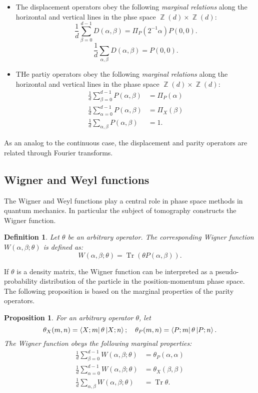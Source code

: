 \documentclass[a4paper]{article}
\DeclareMathOperator{\Z}{\mathbb{Z}}
\DeclareMathOperator{\Tr}{Tr}
\newtheorem{definition}{Definition}
\newtheorem{proposition}{Proposition}
\begin{document}
  \begin{itemize}
    \item The displacement operators obey the following
      \textit{marginal relations} along the horizontal and
      vertical lines in the phse space $\Z(d) \times \Z(d)$:
      \[
        \frac{1}{d} \sum_{\beta=0}^{d-1} D(\alpha,\beta)
        = \Pi_P(2^{-1}\alpha)P(0,0).
      \] 
      \[
        \frac{1}{d} \sum_{\alpha,\beta}^{} D(\alpha,\beta) =
        P(0,0).
      \] 
    \item THe partiy operators obey the following
      \textit{marginal relations} along the horizontal and
      vertical lines in the phase space $\Z(d) \times
      \Z(d)$:
      \begin{align*}
        \frac{1}{d} \sum_{\beta=0}^{d-1} P(\alpha,\beta)
        &= \Pi_P(\alpha) \\
        \frac{1}{d} \sum_{\alpha=0}^{d-1} P(\alpha,\beta)
        &= \Pi_X(\beta) \\
        \frac{1}{d} \sum_{\alpha,\beta}^{} P(\alpha,\beta)
        &= 1.
      \end{align*}
  \end{itemize}

  As an analog to the continuous case, the displacement and
  parity operators are related through Fourier transforms.

  \subsection{Wigner and Weyl functions}

  The Wigner and Weyl functions play a central role in phase
  space methods in quantum mechanics. In particular the
  subject of tomography constructs the Wigner function.

  \begin{definition}
    Let $\theta$ be an arbitrary operator. The corresponding
    Wigner function $W(\alpha,\beta; \theta)$ is defined as:
    \[
      W(\alpha,\beta; \theta) = \Tr\left( \theta
      P(\alpha,\beta) \right).
    \] 
  \end{definition}
  If $\theta$ is a density matrix, the Wigner function can
  be interpreted as a pseudo-probability distribution of the
  particle in the position-momentum phase space. The
  following proposition is based on the marginal properties
  of the parity operators.

  \begin{proposition}
    For an arbitrary operator $\theta$, let
    \[
      \theta_X(m,n) = \bra{X; m}\theta\ket{X; n};
      \quad
      \theta_P(m,n) = \bra{P; m}\theta\ket{P; n}.
    \] 
    The Wigner function obeys the following marginal
    properties:
    \begin{align*}
      \frac{1}{d} \sum_{\beta=0}^{d-1} W(\alpha,\beta;
      \theta)
      &= \theta_P(\alpha,\alpha) \\
      \frac{1}{d} \sum_{\alpha=0}^{d-1} W(\alpha,\beta;
      \theta)
      &= \theta_X(\beta,\beta) \\
      \frac{1}{d} \sum_{\alpha,\beta}^{} W(\alpha,\beta;
      \theta) 
      &= \Tr \theta.
    \end{align*}
  \end{proposition}
\end{document}
